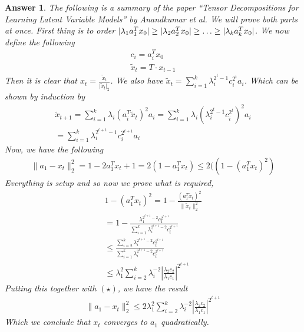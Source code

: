 \documentclass[12pt]{article}
\theoremstyle{colon}
\newtheorem*{answer}{Answer}
\begin{document}
\begin{answer}
  The following is a summary of the paper ``Tensor Decompositions for Learning Latent Variable Models'' by Anandkumar et al. We will prove both parts at once. First thing is to order $\lvert \lambda_1 a_1^T x_0 \rvert \geq \lvert \lambda_2 a_2^T x_0 \rvert \geq \mathellipsis \geq \lvert \lambda_k a_k^T x_0 \rvert$. We now define the following
  \begin{gather*}
    c_i = a_i^T x_0 \\
    \tilde{x}_t = T \cdot x_{t-1}
  \end{gather*}
  Then it is clear that $x_t = \frac{\tilde{x}_t}{\lvert \tilde{x}_t \rvert_2}$. We also have $\tilde{x}_t = \sum_{i=1}^k \lambda_i^{2^t - 1}c_i^{2^t} a_i$. Which can be shown by induction by
  \begin{gather*}
    \tilde{x}_{t+1} = \sum_{i = 1}^k \lambda_i (a_i^T \tilde{x}_t)^2 a_i = \sum_{i = 1}^k \lambda_i (\lambda_i^{2^t-1} c_i^{2^t})^2 a_i \\
    = \sum_{i = 1}^k \lambda_i^{2^{t+1}-1} c_i^{2^{t+1}} a_i
  \end{gather*}
  Now, we have the following
  \begin{gather*}
    \lVert a_1 - x_t \rVert_2^2 = 1 - 2a_1^T x_t + 1 =  2(1 - a_1^T x_t) \leq 2((1 - (a_1^T x_t)^2) \tag{$\star$}
  \end{gather*}
  Everything is setup and so now we prove what is required,
  \begin{gather*}
    1 - (a_1^T x_t)^2 = 1 - \frac{(a_1^T \tilde{x}_t)^2}{\lVert \tilde{x}_t \rVert_2^2} \\
    = 1 - \frac{\lambda_1^{2^{t+1}-2}c_1^{2^{t+1}}}{\sum_{i=1}^k \lambda_i^{2^{t+1}-2}c_i^{2^{t+1}}} \\
    \leq \frac{\sum_{i=2}^k \lambda_i^{2^{t+1}-2}c_i^{2^{t+1}}}{\sum_{i=1}^k \lambda_i^{2^{t+1}-2}c_i^{2^{t+1}}} \\
    \leq \lambda_1^2 \sum_{i=2}^k \lambda_i^{-2} \left\lvert \frac{\lambda_2 c_2}{\lambda_1 c_1} \right\rvert^{2^{t+1}}
  \end{gather*}
  Putting this together with $(\star)$, we have the result
  \begin{gather*}
    \lVert a_1 - x_t \rVert_2^2 \leq 2 \lambda_1^2 \sum_{i=2}^k \lambda_i^{-2} \left\lvert \frac{\lambda_2 c_2}{\lambda_1 c_1} \right\rvert^{2^{t+1}}
  \end{gather*}
  Which we conclude that $x_t$ converges to $a_1$ quadratically.
\end{answer}
\end{document}
